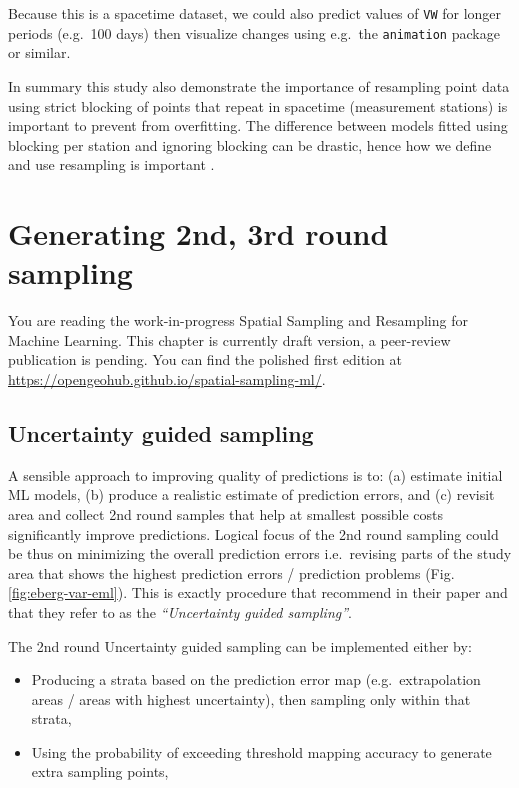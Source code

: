 \documentclass[
  graybox,natbib,nospthms]{svmono}
\providecommand{\tightlist}{%
  \setlength{\itemsep}{0pt}\setlength{\parskip}{0pt}}
\providecommand{\tightlist}{\setlength{\itemsep}{0pt}\setlength{\parskip}{0pt}}
\begin{document}
Because this is a spacetime dataset, we could also predict values of \texttt{VW} for
longer periods (e.g.~100 days) then visualize changes using e.g.~the \texttt{animation}
package or similar.

In summary this study also demonstrate the importance of resampling point data
using strict blocking of points that repeat in spacetime (measurement stations) is
important to prevent from overfitting. The difference between models fitted using
blocking per station and ignoring blocking can be drastic, hence how we
define and use resampling is important \citep{meyer2018improving}.

\hypertarget{generating-2nd-3rd-round-sampling}{%
\chapter{Generating 2nd, 3rd round sampling}\label{generating-2nd-3rd-round-sampling}}

You are reading the work-in-progress Spatial Sampling and Resampling for Machine Learning. This chapter is currently draft version, a peer-review publication is pending. You can find the polished first edition at \url{https://opengeohub.github.io/spatial-sampling-ml/}.

\hypertarget{uncertainty-guided-sampling}{%
\section{Uncertainty guided sampling}\label{uncertainty-guided-sampling}}

A sensible approach to improving quality of predictions is to: (a) estimate initial
ML models, (b) produce a realistic estimate of prediction errors, and (c) revisit
area and collect 2nd round samples that help at smallest possible costs significantly
improve predictions. Logical focus of the 2nd round sampling could be thus on minimizing
the overall prediction errors i.e.~revising parts of the study area that shows the
highest prediction errors / prediction problems (Fig. \ref{fig:eberg-var-eml}).
This is exactly procedure that \citet{stumpf2017uncertainty} recommend in their paper and
that they refer to as the \emph{``Uncertainty guided sampling''}.

The 2nd round Uncertainty guided sampling can be implemented either by:

\begin{itemize}
\tightlist
\item
  Producing a strata based on the prediction error map (e.g.~extrapolation areas / areas with highest uncertainty), then sampling only within that strata,
\item
  Using the probability of exceeding threshold mapping accuracy to generate extra sampling points,
\end{itemize}
\end{document}

